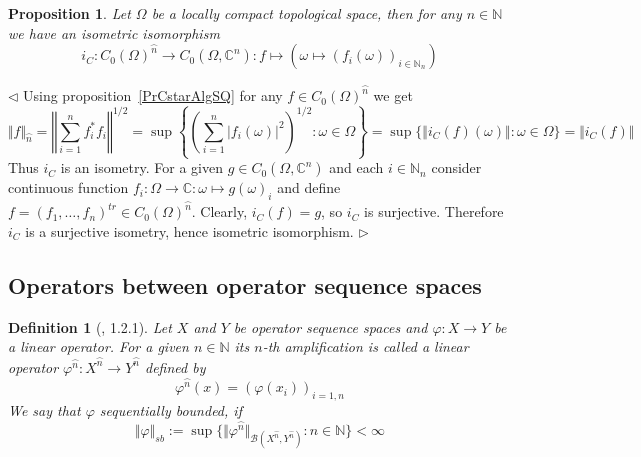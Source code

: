 \documentclass[12pt]{article}
\newtheorem{proposition}[theorem]{Proposition}
\newtheorem{definition}[theorem]{Definition}
\newenvironment{proof}{\par $\triangleleft$}{$\triangleright$}
\begin{document}
\begin{proposition}\label{PrCommCstarSQ} Let $\Omega$ be a locally compact
topological space, then for any $n\in\mathbb{N}$ we have an isometric
isomorphism
$$
i_C:{C_0(\Omega)}^{\wideparen{n}}\to C_0(\Omega,\mathbb{C}^n):
f\mapsto (\omega\mapsto{(f_i(\omega))}_{i\in\mathbb{N}_n})
$$
\end{proposition} 
\begin{proof} Using proposition~\ref{PrCstarAlgSQ} for any 
$f\in {C_0(\Omega)}^{\wideparen{n}}$ we get
$$
\Vert f\Vert_{\wideparen{n}}
=\left\Vert \sum\limits_{i=1}^n f_i^* f_i\right\Vert^{1/2}
=\sup\left \{
    {\left(\sum\limits_{i=1}^n |f_i(\omega)|^2\right)}^{1/2}:\omega\in\Omega
\right \}
=\sup \{\Vert i_C(f)(\omega)\Vert:\omega\in\Omega \}
=\Vert i_C(f)\Vert
$$
Thus $i_C$ is an isometry. For a given $g\in C_0(\Omega,\mathbb{C}^n)$ and each
$i\in\mathbb{N}_n$ consider continuous function
$f_i:\Omega\to\mathbb{C}:\omega\mapsto {g(\omega)}_i$ and define
$f={(f_1,\ldots,f_n)}^{tr}\in {C_0(\Omega)}^{\wideparen{n}}$. 
Clearly, $i_C(f)=g$, so $i_C$ is surjective. 
Therefore $i_C$ is a surjective isometry, hence isometric isomorphism.
\end{proof}




























\subsection{Operators between operator sequence spaces}

\begin{definition}[\cite{LamOpFolgen}, 1.2.1]\label{DefSBOp} Let $X$ and $Y$ be
operator sequence spaces and $\varphi : X \to Y$ be a linear operator. For a
given $n\in\mathbb{N}$ its $n$-th \textit{amplification} is called a linear
operator $\varphi^{\wideparen{n}} : X^{\wideparen{n}} \to Y^{\wideparen{n}}$
defined by 
$$
\varphi^{\wideparen{n}}(x)={(\varphi(x_i))}_{i=1,n}
$$
We say that $\varphi$ \textit{sequentially bounded}, if 
$$
\Vert \varphi \Vert_{sb} 
:= \sup \{
    \Vert 
        \varphi^{\wideparen{n}}
    \Vert_{\mathcal{B}(X^{\wideparen{n}},Y^{\wideparen{n}})}
    :n\in\mathbb{N}
 \}  < \infty
$$
\end{definition}
\end{document}
